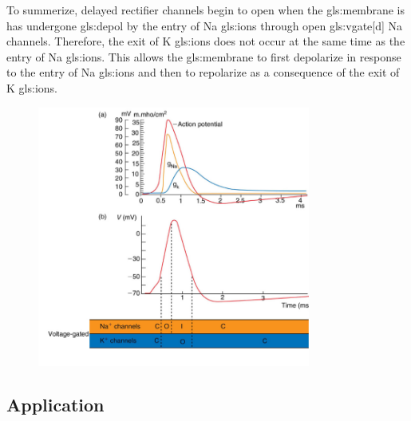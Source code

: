 \documentclass[class={myRUCProject}, crop=false]{standalone}
\begin{document}
To summerize, %
delayed rectifier channels begin to open when the \gls{gls:membrane} is has undergone \gls{gls:depol} by the entry of \gls{Na} \glspl{gls:ion} through open \gls{gls:vgate}[d] \gls{Na} channels. 
Therefore, the exit of \gls{K} \glspl{gls:ion} does not occur at the same time as the entry of \gls{Na} \glspl{gls:ion}. This allows the \gls{gls:membrane} to first depolarize in response to the entry of \gls{Na} \glspl{gls:ion} and then to repolarize as a consequence of the exit of \gls{K} \glspl{gls:ion}.

\begin{figure}[H]
    \centering
    \includegraphics[width=0.8\textwidth]{Pictures//Anakin/N.K.png}
    \caption{}\label{fig:Knumber}
\end{figure}



\subsection{Application} 
\end{document}
